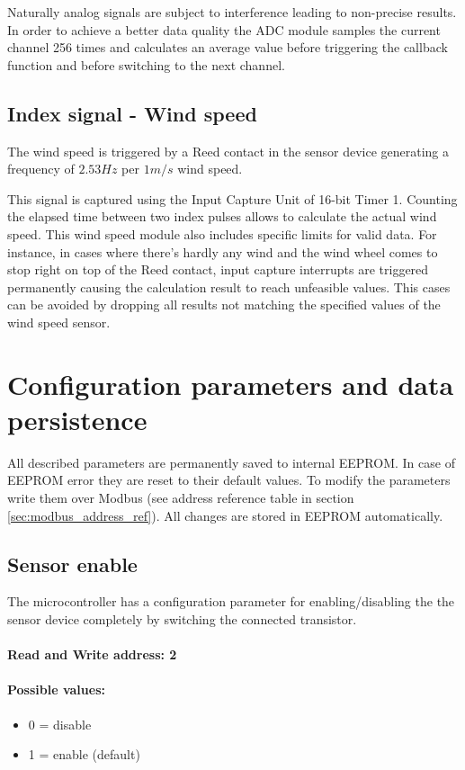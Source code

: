 Naturally analog signals are subject to interference leading to non-precise results. In order to achieve a better data quality the ADC module samples the current channel 256 times and calculates an average value before triggering the callback function and before switching to the next channel.

\subsection{Index signal - Wind speed}
The wind speed is triggered by a Reed contact in the sensor device generating a frequency of $2.53 Hz$ per $1 m/s$ wind speed.

This signal is captured using the Input Capture Unit of 16-bit Timer 1. Counting the elapsed time between two index pulses allows to calculate the actual wind speed. This wind speed module also includes specific limits for valid data. For instance, in cases where there's hardly any wind and the wind wheel comes to stop right on top of the Reed contact, input capture interrupts are triggered permanently causing the calculation result to reach unfeasible values. This cases can be avoided by dropping all results not matching the specified values of the wind speed sensor.

\section{Configuration parameters and data persistence}
All described parameters are permanently saved to internal EEPROM. In case of EEPROM error they are reset to their default values. To modify the parameters write them over Modbus (see address reference table in section \ref{sec:modbus_address_ref}). All changes are stored in EEPROM automatically.

\subsection{Sensor enable}
The microcontroller has a configuration parameter for enabling/disabling the the sensor device completely by switching the connected transistor. 

\paragraph{Read and Write address: 2}
\paragraph{Possible values:}
\begin{itemize}
    \item 0 = disable
    \item 1 = enable (default)
\end{itemize}


